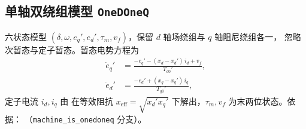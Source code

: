 \subsection{单轴双绕组模型 \texttt{OneDOneQ}}
\label{sec:dynamics-machine-onedoneq}
六状态模型 $(\delta,\omega,e_q',e_d',\tau_m,v_f)$，保留 $d$ 轴场绕组与 $q$ 轴阻尼绕组各一，
忽略次暂态与定子暂态。暂态电势方程为
\begin{align}
 \dot e_q' &= \frac{-e_q'-(x_d-x_d')\,i_d+v_f}{T_{d0}'},\\
 \dot e_d' &= \frac{-e_d'+(x_q-x_q')\,i_q}{T_{q0}'},
\end{align}
定子电流 $i_d,i_q$ 由  在等效阻抗
$x_{\mathrm{eff}}=\sqrt{x_d'x_q'}$ 下解出，$\tau_m,v_f$ 为末两位状态。依据：
（\texttt{machine\_is\_onedoneq} 分支）。

